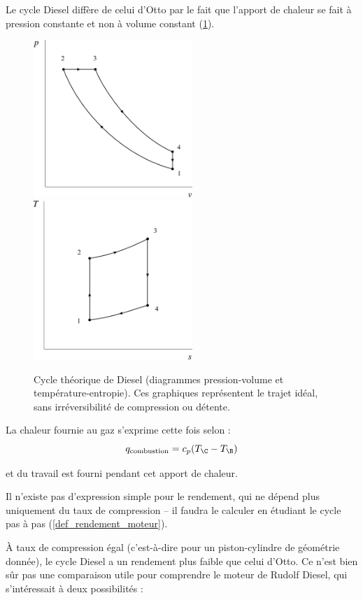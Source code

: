 		Le cycle Diesel diffère de celui d’Otto par le fait que l’apport de chaleur se fait à pression constante et non à volume constant (\cref{fig_cycle_diesel}).

		\begin{figure}
			\begin{center}
				\includegraphics[width=6cm]{images/pv_gp_diesel.png}
				\includegraphics[width=6cm]{images/ts_gp_diesel.png}
			\end{center}
			\caption{Cycle théorique de Diesel (diagrammes pression-volume et température-entropie).
			Ces graphiques représentent le trajet idéal, sans irréversibilité de compression ou détente.}
			\label{fig_cycle_diesel}
		\end{figure}

		La chaleur fournie au gaz s’exprime cette fois selon :
		\begin{equation}
			q_\text{combustion} = c_p (T_\C - T_\B )
		\end{equation}

		et du travail est fourni pendant cet apport de chaleur.

		Il n’existe pas d’expression simple pour le rendement, qui ne dépend plus uniquement du taux de compression -- il faudra le calculer en étudiant le cycle pas à pas (\ref{def_rendement_moteur}).

		À taux de compression égal (c’est-à-dire pour un piston-cylindre de géométrie donnée), le cycle Diesel a un rendement plus faible que celui d’Otto. Ce n’est bien sûr pas une comparaison utile pour comprendre le moteur de Rudolf Diesel, qui s’intéressait à deux possibilités :

